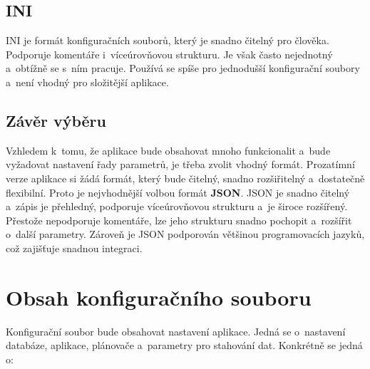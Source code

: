 \subsection{INI}
INI je formát konfiguračních souborů, který je snadno čitelný pro člověka.
Podporuje komentáře i~víceúrovňovou strukturu.
Je však často nejednotný a~obtížně se s~ním pracuje.
Používá se spíše pro jednodušší konfigurační soubory a~není vhodný pro složitější aplikace.

\subsection{Závěr výběru}
Vzhledem k~tomu, že aplikace bude obsahovat mnoho funkcionalit a~bude vyžadovat nastavení řady parametrů, je třeba zvolit vhodný formát.
Prozatímní verze aplikace si žádá formát, který bude čitelný, snadno rozšiřitelný a~dostatečně flexibilní.
Proto je nejvhodnější volbou formát \textbf{JSON}.
JSON je snadno čitelný a~zápis je přehledný, podporuje víceúrovňovou strukturu a~je široce rozšířený.
Přestože nepodporuje komentáře, lze jeho strukturu snadno pochopit a~rozšířit o~další parametry.
Zároveň je JSON podporován většinou programovacích jazyků, což zajišťuje snadnou integraci.

\newpage

\section{Obsah konfiguračního souboru}
Konfigurační soubor bude obsahovat nastavení aplikace.
Jedná se o~nastavení databáze, aplikace, plánovače a~parametry pro stahování dat.
Konkrétně se jedná o:

